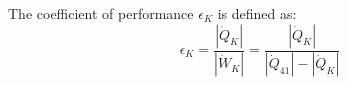 The coefficient of performance \( \epsilon_K \) is defined as:  
\[
\epsilon_K = \frac{|\dot{Q}_K|}{|\dot{W}_K|} = \frac{|\dot{Q}_K|}{|\dot{Q}_{41}| - |\dot{Q}_K|}
\]
